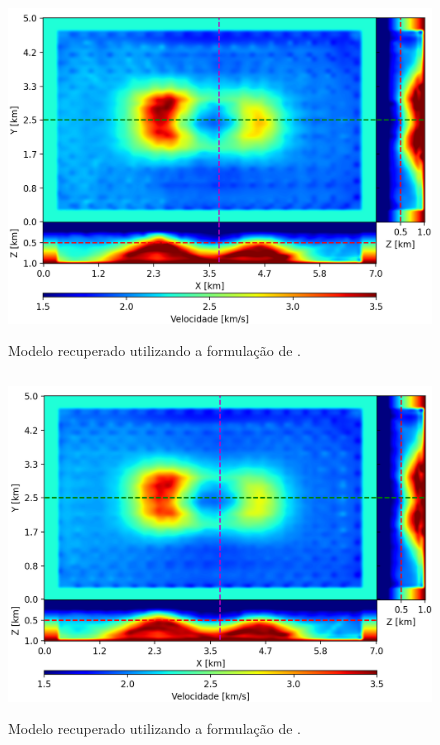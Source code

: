 \begin{figure}[H]
	\centering
	\includegraphics[width=12cm,height=9cm]{Imgs/Resultados/fim_refined.png}
	\caption{Modelo recuperado utilizando a formulação de .}
	\label{fig:fim_refined}	
\end{figure}


\begin{figure}[H]
	\centering
	\includegraphics[width=12cm,height=9cm]{Imgs/Resultados/fsm_refined.png}
	\caption{Modelo recuperado utilizando a formulação de .}
	\label{fig:fsm_refined}	
\end{figure}





